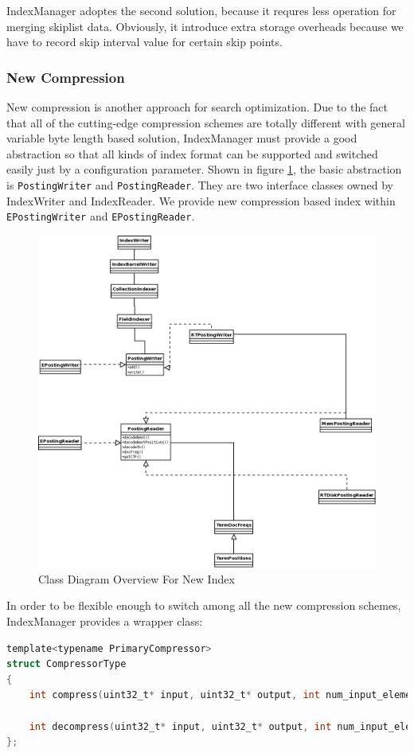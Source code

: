 IndexManager adoptes the second solution, because it requres less operation for merging skiplist data. Obviously, it introduce extra storage overheads because we have to record skip interval value for certain skip points.

\subsubsection{New Compression}
New compression is another approach for search optimization. Due to the fact that all of the cutting-edge compression schemes are totally different with general variable byte length based solution, IndexManager must provide a 
good abstraction so that all kinds of index format can be supported and switched easily just by a configuration parameter. Shown in figure \ref{newindexclass}, the basic abstraction is \texttt{PostingWriter} and \texttt{PostingReader}.
They are two interface classes owned by IndexWriter and IndexReader. We provide new compression based index within \texttt{EPostingWriter} and \texttt{EPostingReader}.

\begin{figure}[h!]
\centerline{\includegraphics[width=.8\textwidth]{Figures/newindexclass.png}}
\caption{Class Diagram Overview For New Index}\label{newindexclass}
\end{figure}


In order to be flexible enough to switch among all the new compression schemes, IndexManager provides a wrapper class:

\begin{lstlisting}[language=C]
template<typename PrimaryCompressor>
struct CompressorType
{
    int compress(uint32_t* input, uint32_t* output, int num_input_elements) const;

    int decompress(uint32_t* input, uint32_t* output, int num_input_elements) const;
};
\end{lstlisting}

